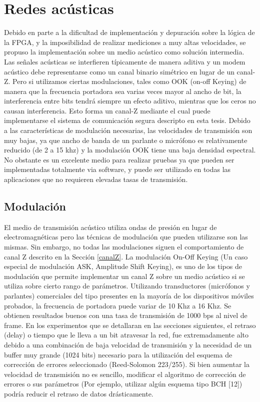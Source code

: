 \section{Redes acústicas}
Debido en parte a la dificultad de implementación y depuración sobre la lógica de la FPGA, y la imposibilidad de realizar mediciones a muy altas velocidades, se propuso la implementación sobre un medio acústico como solución intermedia. Las señales acústicas se interfieren típicamente de manera aditiva y un modem acústico debe representarse como un canal binario simétrico en lugar de un canal-Z. Pero si utilizamos ciertas modulaciones, tales como OOK (on-off Keying) de manera que la frecuencia portadora sea varias veces mayor al ancho de bit, la interferencia entre bits tendrá siempre un efecto aditivo, mientras que los ceros no causan interferencia. Esto forma un canal-Z mediante el cual puede implementarse el sistema de comunicación segura descripto en esta tesis. Debido a las características de modulación necesarias, las velocidades de transmisión son muy bajas, ya que ancho de banda de un parlante o micrófono es relativamente reducido (de 2 a 15 khz) y la modulación OOK tiene una baja densidad espectral. 
No obstante es un excelente medio para realizar pruebas ya que pueden ser implementadas totalmente via software, y puede ser utilizado en todas las aplicaciones que no requieren elevadas tasas de transmisión.

\subsection{Modulación}
El medio de transmisión acústico utiliza ondas de presión en lugar de electromagnéticas pero las técnicas de modulación que pueden utilizarse son las mismas.
Sin embargo, no todas las modulaciones siguen el comportamiento de canal Z descrito en la Sección \ref{canalZ}.
La modulación On-Off Keying (Un caso especial de modulación ASK, Amplitude Shift Keying), es uno de los tipos de modulación que permite implementar un canal Z sobre un medio acústico si se utiliza sobre cierto rango de parámetros. Utilizando transductores (micrófonos y parlantes) comerciales del tipo presentes en la mayoría de los dispositivos móviles probados, la frecuencia de portadora puede variar de 10 Khz a 16 Khz. Se obtienen resultados buenos con una tasa de transmisión de 1000 bps al nivel de frame. En los experimentos que se detallaran en las secciones siguientes, el retraso (delay) o tiempo que le lleva a un bit atravesar la red, fue extremadamente alto debido a una combinación de baja velocidad de transmisión y la necesidad de un buffer muy grande (1024 bits) necesario para la utilización del esquema de corrección de errores seleccionado (Reed-Solomon 223/255). Si bien aumentar la velocidad de transmisión no es sencillo, modificar el algoritmo de corrección de errores o sus parámetros (Por ejemplo, utilizar algún esquema tipo BCH [12]) podría reducir el retraso de datos drásticamente.

